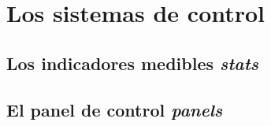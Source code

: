 \chapter{Los sistemas de control}

\section{Los indicadores medibles \emph{stats}}
\section{El panel de control \emph{panels}}
